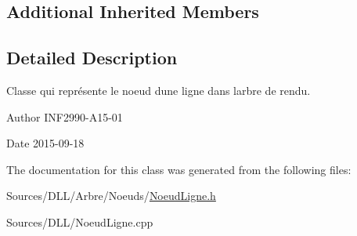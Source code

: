 \subsection*{Additional Inherited Members}


\subsection{Detailed Description}
Classe qui représente le noeud d\textquotesingle{}une ligne dans l\textquotesingle{}arbre de rendu. 

\begin{DoxyAuthor}{Author}
I\+N\+F2990-\/\+A15-\/01 
\end{DoxyAuthor}
\begin{DoxyDate}{Date}
2015-\/09-\/18 
\end{DoxyDate}


The documentation for this class was generated from the following files\+:\begin{DoxyCompactItemize}
\item 
Sources/\+D\+L\+L/\+Arbre/\+Noeuds/\hyperlink{_noeud_ligne_8h}{Noeud\+Ligne.\+h}\item 
Sources/\+D\+L\+L/Noeud\+Ligne.\+cpp\end{DoxyCompactItemize}
